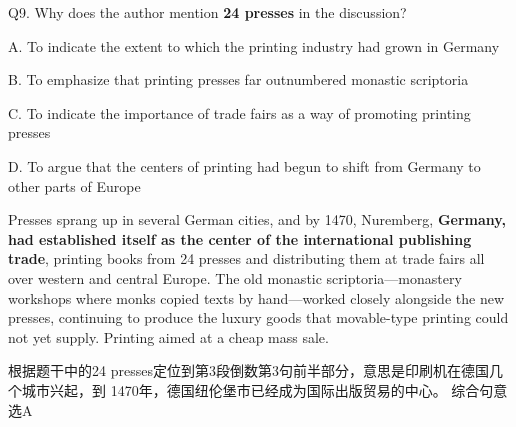 \begin{blk}
    \begin{qst}
        Q9. Why does the author mention \textbf{24 presses} in the discussion?
    \end{qst}

    \begin{chc}
        A. To indicate the extent to which the printing industry had grown in Germany

        B. To emphasize that printing presses far outnumbered monastic scriptoria

        C. To indicate the importance of trade fairs as a way of promoting printing presses

        D. To argue that the centers of printing had begun to shift from Germany to other parts of Europe
    \end{chc}

    \begin{psgq}
        Presses sprang up in several German cities, and by 1470, Nuremberg, \textbf{Germany, had established itself as the center of the international publishing trade}, printing books from 24 presses and distributing them at trade fairs all over western and central Europe. The old monastic scriptoria—monastery workshops where monks copied texts by hand—worked closely alongside the new presses, continuing to produce the luxury goods that movable-type printing could not yet supply. Printing aimed at a cheap mass sale.
    \end{psgq}

    \begin{nlz}
        根据题干中的24 presses定位到第3段倒数第3句前半部分，意思是印刷机在德国几个城市兴起，到 1470年，德国纽伦堡市已经成为国际出版贸易的中心。 综合句意选A
    \end{nlz}
\end{blk}

